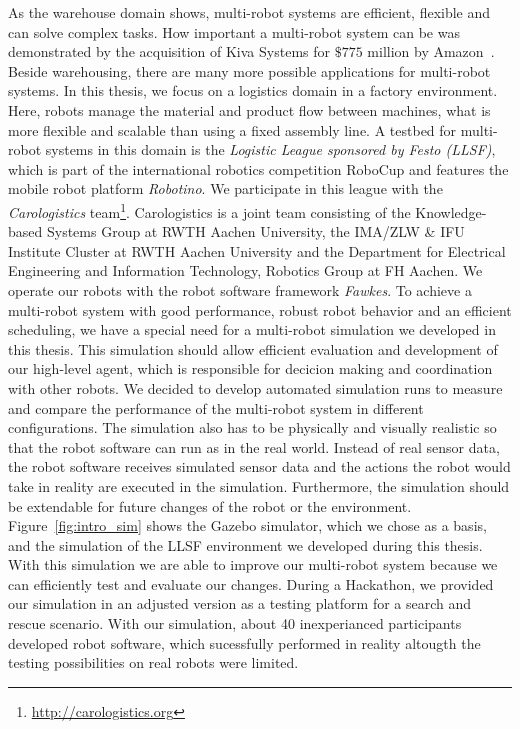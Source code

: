 As the warehouse domain shows, multi-robot systems are efficient, flexible and can solve complex tasks. How important a multi-robot system can be was demonstrated by the acquisition of Kiva Systems for $\$775$ million by Amazon~\cite{kiva_amazon}. Beside warehousing, there are many more possible applications for multi-robot systems. In this thesis, we focus on a logistics domain in a factory environment. Here, robots manage the material and product flow between machines, what is more flexible and scalable than using a fixed assembly line. A testbed for multi-robot systems in this domain is the \textit{Logistic League sponsored by Festo (LLSF)}, which is part of the international robotics competition RoboCup and features the mobile robot platform \textit{Robotino}. We participate in this league with the \textit{Carologistics} team\footnote{\url{http://carologistics.org}}. Carologistics is a joint team consisting of the Knowledge-based Systems Group at RWTH Aachen University, the IMA/ZLW \& IFU Institute Cluster at RWTH Aachen University and the Department for Electrical Engineering and Information Technology, Robotics Group at FH Aachen. We operate our robots with the robot software framework \textit{Fawkes}. To achieve a multi-robot system with good performance, robust robot behavior and an efficient scheduling, we have a special need for a multi-robot simulation we developed in this thesis. This simulation should allow efficient evaluation and development of our high-level agent, which is responsible for decicion making and coordination with other robots. We decided to develop automated simulation runs to measure and compare the performance of the multi-robot system in different configurations. The simulation also has to be physically and visually realistic so that the robot software can run as in the real world. Instead of real sensor data, the robot software receives simulated sensor data and the actions the robot would take in reality are executed in the simulation. Furthermore, the simulation should be extendable for future changes of the robot or the environment.\\
Figure~\ref{fig:intro_sim} shows the Gazebo simulator, which we chose as a basis, and the simulation of the LLSF environment we developed during this thesis. With this simulation we are able to improve our multi-robot system because we can efficiently test and evaluate our changes. During a Hackathon, we provided our simulation in an adjusted version as a testing platform for a search and rescue scenario. With our simulation, about 40 inexperianced participants developed robot software, which sucessfully performed in reality altougth the testing possibilities on real robots were limited. 
